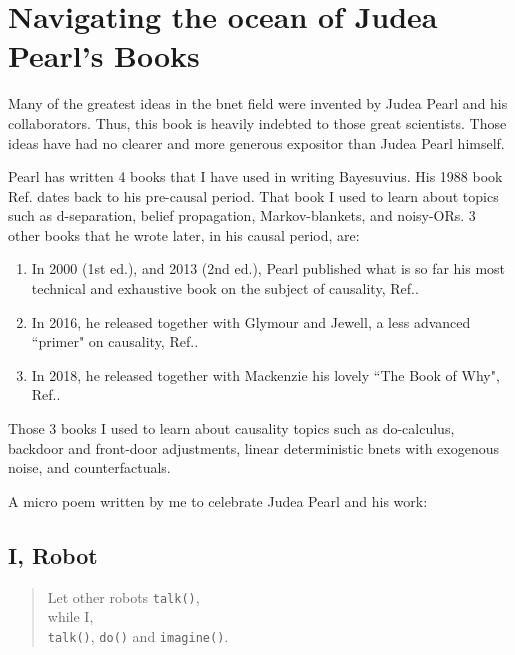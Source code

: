 \chapter*{Navigating 
the ocean of Judea Pearl's Books}
\label{ch-nav-pearl}
Many
of the
greatest ideas 
in the bnet field 
were invented by Judea Pearl
and his collaborators.
Thus, this book is 
heavily indebted to
those great scientists.
Those ideas have had no clearer
and more generous 
expositor than Judea Pearl
himself.

Pearl has written
4 books that I have used
in writing Bayesuvius.
His 
1988 book Ref.\cite{pearl-1988book}
dates back to his pre-causal period.
That book I used to learn
about topics such as
d-separation, belief propagation,
Markov-blankets, and noisy-ORs.
3 other books that  he  wrote later,
in his causal period, 
are:
\begin{enumerate}
\item
In 2000 (1st ed.), and 2013 (2nd ed.),
Pearl published what
is so far
his most technical
and exhaustive book
on the subject of causality,
Ref.\cite{pearl-2013book}.
\item
In 2016,
he released 
together
with Glymour and Jewell,
a less advanced ``primer"
on causality, Ref.\cite{pearl-primer}.
\item
In 2018, 
he released 
together with
Mackenzie his
lovely  ``The Book of Why",
 Ref.\cite{book-why}.
\end{enumerate}
Those 3 books I used to learn
about causality topics
such as do-calculus,
backdoor and front-door
adjustments, 
linear 
deterministic 
bnets with exogenous noise,
and counterfactuals.

A micro poem written by me
to celebrate Judea Pearl and 
his work:
 
\section*{I, Robot}
\begin{verse}
Let other robots {\tt talk()},\\
while I,\\
{\tt talk()}, {\tt do()} and {\tt imagine()}.
\end{verse}
